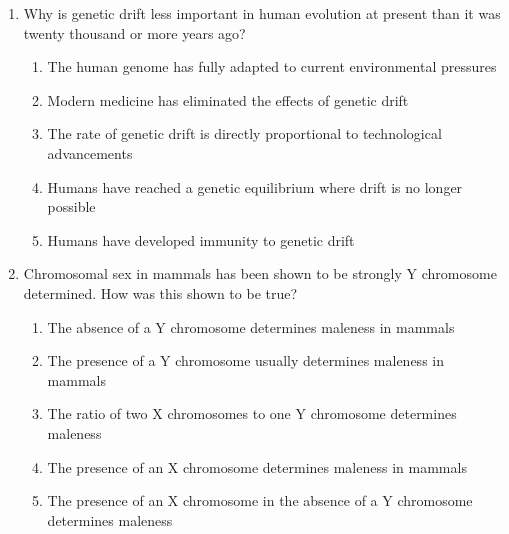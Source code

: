 \documentclass[12pt]{article}
\begin{document}
\begin{enumerate}[label=\arabic*.]
\begin{enumerate}[label=(\alph*)]
    \item Regulates the pH level within the cell
    \item Transports oxygen throughout the cell
    \item Removes nitrogenous wastes
\end{enumerate}
\item Why is genetic drift less important in human evolution at present than it was twenty thousand or more years ago?
\begin{enumerate}[label=(\alph*)]
    \item The human genome has fully adapted to current environmental pressures
    \item Modern medicine has eliminated the effects of genetic drift
    \item The rate of genetic drift is directly proportional to technological advancements
    \item Humans have reached a genetic equilibrium where drift is no longer possible
    \item Humans have developed immunity to genetic drift
\end{enumerate}
\item Chromosomal sex in mammals has been shown to be strongly Y chromosome determined. How was this shown to be true?
\begin{enumerate}[label=(\alph*)]
    \item The absence of a Y chromosome determines maleness in mammals
    \item The presence of a Y chromosome usually determines maleness in mammals
    \item The ratio of two X chromosomes to one Y chromosome determines maleness
    \item The presence of an X chromosome determines maleness in mammals
    \item The presence of an X chromosome in the absence of a Y chromosome determines maleness
\end{enumerate}
\end{enumerate}
\end{document}
